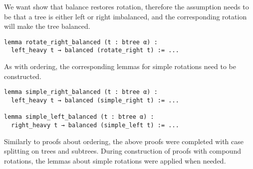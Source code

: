 We want show that balance restores rotation, therefore the assumption needs to be that a tree is either left or right imbalanced, and the corresponding rotation will make the tree balanced.

\begin{lstlisting}
lemma rotate_right_balanced (t : btree α) :
  left_heavy t → balanced (rotate_right t) := ...
\end{lstlisting}

As with ordering, the corresponding lemmas for simple rotations need to be constructed.

\begin{lstlisting}
lemma simple_right_balanced (t : btree α) :
  left_heavy t → balanced (simple_right t) := ...
  
lemma simple_left_balanced (t : btree α) :
  right_heavy t → balanced (simple_left t) := ...
\end{lstlisting}

Similarly to proofs about ordering, the above proofs were completed with case splitting on trees and subtrees. During construction of proofs with compound rotations, the lemmas about simple rotations were applied when needed. 


